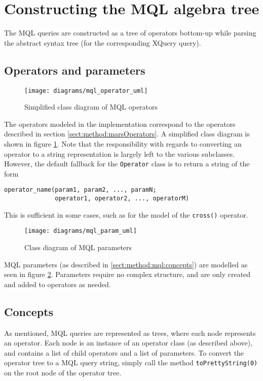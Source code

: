 \section{Constructing the MQL algebra tree}
\label{sect:impl:construct_mql}
The MQL queries are constructed as a tree of operators bottom-up while parsing
the abstract syntax tree (for the corresponding XQuery query). 

\subsection{Operators and parameters}
\begin{figure}[!htp]
\begin{center}
  \texttt{[image: diagrams/mql\_operator\_uml]}
  \caption{Simplified class diagram of MQL operators}
  \label{fig:impl:mql_op_uml}
\end{center}
\end{figure}
The operators modeled in the implementation correspond to the operators
described in section \ref{sect:method:marsOperators}. A simplified class
diagram is shown in figure \ref{fig:impl:mql_op_uml}. Note that the
responsibility with regards to converting an operator to a string
representation is largely left to the various subclasses. However, the default
fallback for the \texttt{Operator} class is to return a string of the form
\begin{Verbatim}
operator_name(param1, param2, ..., paramN; 
              operator1, operator2, ..., operatorM)
\end{Verbatim}
This is sufficient in some cases, such as for the model of the \texttt{cross()}
operator.

\begin{figure}[!htp]
\begin{center}
  \texttt{[image: diagrams/mql\_param\_uml]}
  \caption{Class diagram of MQL parameters}
  \label{fig:impl:mql_param_uml}
\end{center}
\end{figure}

MQL parameters (as described in \ref{sect:method:mql:concepts}) are modelled as
seen in figure \ref{fig:impl:mql_param_uml}. Parameters require no complex
structure, and are only created and added to operators as needed.

\subsection{Concepts}
As mentioned, MQL queries are represented as trees, where each node represents
an operator. Each node is an instance of an operator class (as described
above), and contains a list of child operators and a list of parameters. To
convert the operator tree to a MQL query string, simply call the method
\texttt{toPrettyString(0)} on the root node of the operator tree.

